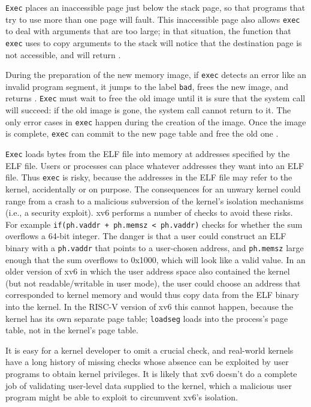\lstinline{Exec}
places an inaccessible page just below the stack page,
so that programs that try to use more than one page will fault.
This inaccessible page also allows
\lstinline{exec}
to deal with arguments that are too large;
in that situation,
the
function that
\lstinline{exec}
uses to copy arguments to the stack will notice that
the destination page is not accessible, and will
return .

During the preparation of the new memory image,
if
\lstinline{exec}
detects an error like an invalid program segment,
it jumps to the label
\lstinline{bad},
frees the new image,
and returns .
\lstinline{Exec}
must wait to free the old image until it
is sure that the system call will succeed:
if the old image is gone,
the system call cannot return  to it.
The only error cases in
\lstinline{exec}
happen during the creation of the image.
Once the image is complete,
\lstinline{exec}
can commit to the new page table
and free the old one
.

\lstinline{Exec}
loads bytes from the ELF file into memory at addresses specified by the ELF file.
Users or processes can place whatever addresses they want into an ELF file.
Thus
\lstinline{exec}
is risky, because the addresses in the ELF file may refer to the kernel, accidentally
or on purpose. The consequences for an unwary kernel could range from
a crash to a malicious subversion of the kernel's isolation mechanisms
(i.e., a security exploit).
xv6 performs a number of checks to avoid these risks.
For example
\lstinline{if(ph.vaddr + ph.memsz < ph.vaddr)}
checks for whether the sum overflows a 64-bit integer.
The danger is that a user could construct an ELF binary with a
\lstinline{ph.vaddr}
that points to a user-chosen address,
and
\lstinline{ph.memsz}
large enough that the sum overflows to 0x1000, which will look like a
valid value. In an older version of xv6 in which the user address
space also contained the kernel (but not readable/writable in user
mode), the user could choose an address that corresponded to kernel
memory and would thus copy data from the ELF binary into the kernel.
In the RISC-V version of xv6 this cannot happen, because the kernel has
its own separate page table;
\lstinline{loadseg}
loads into the process's page table, not in the kernel's page table.

It is easy for a kernel developer to omit a crucial check, and
real-world kernels have a long history of missing checks whose absence
can be exploited by user programs to obtain kernel privileges.  It is likely that xv6 doesn't do a complete job of validating
user-level data supplied to the kernel, which a malicious user program might be able to exploit to circumvent xv6's isolation.
